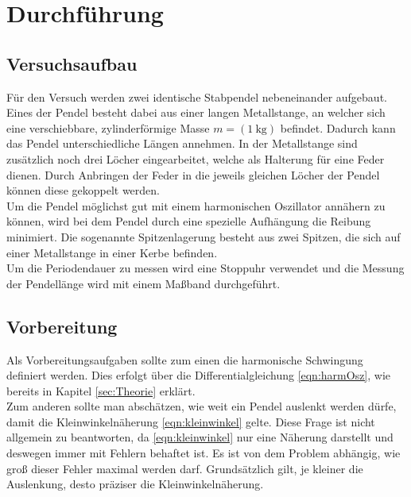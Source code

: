 \section{Durchführung}
\label{sec:Durchführung}
\subsection{Versuchsaufbau}
Für den Versuch werden zwei identische Stabpendel nebeneinander aufgebaut. Eines der Pendel besteht dabei aus einer langen Metallstange, an welcher sich eine
verschiebbare, zylinderförmige Masse $m=(\SI{1}{\kilo\gram})$ befindet. Dadurch kann das Pendel unterschiedliche Längen annehmen. In der Metallstange sind zusätzlich
noch drei Löcher eingearbeitet, welche als Halterung für eine Feder dienen. Durch Anbringen der Feder in die jeweils gleichen Löcher der Pendel können diese
gekoppelt werden.
\\
Um die Pendel möglichst gut mit einem harmonischen Oszillator annähern zu können, wird bei dem Pendel durch eine spezielle Aufhängung die Reibung minimiert. 
Die sogenannte Spitzenlagerung besteht aus zwei Spitzen, die sich auf einer Metallstange in einer Kerbe befinden. 
\\
Um die Periodendauer zu messen wird eine Stoppuhr verwendet und die Messung der Pendellänge wird mit einem Maßband durchgeführt.
\subsection{Vorbereitung}
Als Vorbereitungsaufgaben sollte zum einen die harmonische Schwingung definiert werden. Dies erfolgt über die Differentialgleichung
\eqref{eqn:harmOsz}, wie bereits in Kapitel \ref{sec:Theorie} erklärt. 
\\
Zum anderen sollte man abschätzen, wie weit ein Pendel auslenkt werden dürfe, damit die Kleinwinkelnäherung \eqref{eqn:kleinwinkel}
gelte. Diese Frage ist nicht allgemein zu beantworten, da \eqref{eqn:kleinwinkel} nur eine Näherung darstellt und deswegen immer 
mit Fehlern behaftet ist. Es ist von dem Problem abhängig, wie groß dieser Fehler maximal werden darf. Grundsätzlich gilt, je kleiner 
die Auslenkung, desto präziser die Kleinwinkelnäherung.

